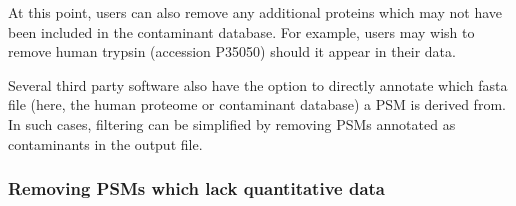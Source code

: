 \documentclass[9pt,a4paper,]{extarticle}
\newenvironment{Shaded}{\begin{snugshade}}{\end{snugshade}}
\newcommand{\ControlFlowTok}[1]{\textcolor[rgb]{0.13,0.29,0.53}{\textbf{#1}}}
\newcommand{\DecValTok}[1]{\textcolor[rgb]{0.00,0.00,0.81}{#1}}
\newcommand{\DocumentationTok}[1]{\textcolor[rgb]{0.56,0.35,0.01}{\textbf{\textit{#1}}}}
\newcommand{\FunctionTok}[1]{\textcolor[rgb]{0.00,0.00,0.00}{#1}}
\newcommand{\NormalTok}[1]{#1}
\newcommand{\OtherTok}[1]{\textcolor[rgb]{0.56,0.35,0.01}{#1}}
\newcommand{\SpecialCharTok}[1]{\textcolor[rgb]{0.00,0.00,0.00}{#1}}
\newcommand{\StringTok}[1]{\textcolor[rgb]{0.31,0.60,0.02}{#1}}
\begin{document}
\begin{Shaded}
\end{Shaded}

At this point, users can also remove any additional proteins which may not have
been included in the contaminant database. For example, users may wish to remove
human trypsin (accession P35050) should it appear in their data.

Several third party software also have the option to directly annotate which
fasta file (here, the human proteome or contaminant database) a PSM is derived
from. In such cases, filtering can be simplified by removing PSMs annotated as
contaminants in the output file.

\hypertarget{removing-psms-which-lack-quantitative-data}{%
\subsubsection{Removing PSMs which lack quantitative data}\label{removing-psms-which-lack-quantitative-data}}
\end{document}
